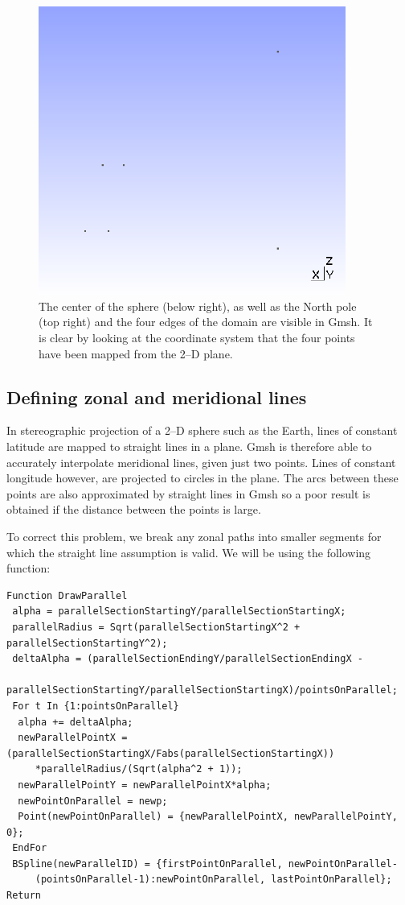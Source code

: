 \begin{figure}[htbp]
 \centering
  \includegraphics[width=0.9\textwidth]{../figures/pointsdefinition}
  \caption{The center of the sphere (below right), as well as the North pole (top right) and the four edges of the domain are visible in Gmsh. It is clear by looking at the coordinate system that the four points have been mapped from the 2--D plane.}
  \label{fig:pointsdefinition}
\end{figure}

\subsection{Defining zonal and meridional lines}
\label{sect:definelinesmanifold}
In stereographic projection of a 2--D sphere such as the Earth, lines of constant latitude are mapped to straight lines in a plane. Gmsh is therefore able to accurately interpolate meridional lines, given just two points. Lines of constant longitude however, are projected to circles in the plane. The arcs between these points are also approximated by straight lines in Gmsh so a poor result is obtained if the distance between the points is large.

To correct this problem, we break any zonal paths into smaller segments for which the straight line assumption is valid. We will be using the following function:
\begin{lstlisting}
Function DrawParallel
 alpha = parallelSectionStartingY/parallelSectionStartingX;
 parallelRadius = Sqrt(parallelSectionStartingX^2 + parallelSectionStartingY^2);
 deltaAlpha = (parallelSectionEndingY/parallelSectionEndingX - 
    parallelSectionStartingY/parallelSectionStartingX)/pointsOnParallel;
 For t In {1:pointsOnParallel}
  alpha += deltaAlpha;
  newParallelPointX = (parallelSectionStartingX/Fabs(parallelSectionStartingX))
     *parallelRadius/(Sqrt(alpha^2 + 1));
  newParallelPointY = newParallelPointX*alpha;
  newPointOnParallel = newp;
  Point(newPointOnParallel) = {newParallelPointX, newParallelPointY, 0};
 EndFor
 BSpline(newParallelID) = {firstPointOnParallel, newPointOnParallel-
     (pointsOnParallel-1):newPointOnParallel, lastPointOnParallel};
Return
\end{lstlisting}

